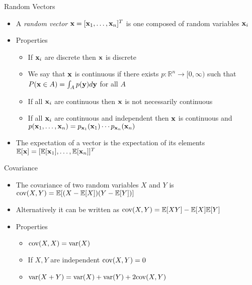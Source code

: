 \documentclass{beamer}
\begin{document}
\begin{frame}{Random Vectors}
\begin{itemize} 
 \item A \emph{random vector} $\textbf{x} = [\textbf{x}_1, \ldots, \textbf{x}_n]^T$ is one composed of random variables $\textbf{x}_i$ 
 \item Properties 
 \begin{itemize}
 \item If $\textbf{x}_i$ are discrete then $\textbf{x}$ is discrete 
 \item We say that $\textbf{x}$ is continuous if there exists $p: \mathbb{R}^n \rightarrow [0, \infty)$ such that $P(\textbf{x} \in A) = \int_A p(\textbf{y}) d \textbf{y} $ for all $A$
 \item If all $\textbf{x}_i$ are continuous then $\textbf{x}$ is not necessarily continuous
 \item If all $\textbf{x}_i$ are continuous and independent then $\textbf{x}$ is continuous and $p(\textbf{x}_1, \ldots, \textbf{x}_n) = p_{\textbf{x}_1}(\textbf{x}_1) \cdots p_{\textbf{x}_n}(\textbf{x}_n)$ 
 \end{itemize} 
 \item The expectation of a vector is the expectation of its elements  $\mathbb{E}[\textbf{x}] = [\mathbb{E}[\textbf{x}_1], \ldots, \mathbb{E}[\textbf{x}_n]]^T$ 
\end{itemize} 
\end{frame}

\begin{frame}{Covariance}  
\begin{itemize}
 \item The covariance of two random variables $X$ and $Y$ is $\mbox{cov}(X, Y) = \mathbb{E}[(X - \mathbb{E}[X])(Y - \mathbb{E}[Y])]$ 
 \item Alternatively it can be written as $\mbox{cov}(X, Y) = \mathbb{E}[XY] - \mathbb{E}[X]\mathbb{E}[Y]$
 \item Properties 
 \begin{itemize}
 \item $\mbox{cov}(X, X) = \mbox{var}(X)$ 
 \item If $X, Y$ are independent $\mbox{cov}(X, Y) = 0$ 
 \item $\mbox{var}(X + Y) = \mbox{var}(X) + \mbox{var}(Y) + 2\mbox{cov}(X, Y)$ 
 \end{itemize} 
\end{itemize}
\end{frame}
\end{document}

